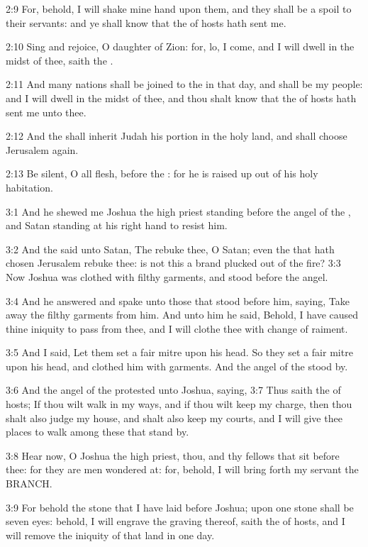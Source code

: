 2:9 For, behold, I will shake mine hand upon them, and they shall be a
spoil to their servants: and ye shall know that the \LORD of hosts hath
sent me.

2:10 Sing and rejoice, O daughter of Zion: for, lo, I come, and I will
dwell in the midst of thee, saith the \LORD.

2:11 And many nations shall be joined to the \LORD in that day, and
shall be my people: and I will dwell in the midst of thee, and thou
shalt know that the \LORD of hosts hath sent me unto thee.

2:12 And the \LORD shall inherit Judah his portion in the holy land,
and shall choose Jerusalem again.

2:13 Be silent, O all flesh, before the \LORD: for he is raised up out
of his holy habitation.

3:1 And he shewed me Joshua the high priest standing before the angel
of the \LORD, and Satan standing at his right hand to resist him.

3:2 And the \LORD said unto Satan, The \LORD rebuke thee, O Satan; even
the \LORD that hath chosen Jerusalem rebuke thee: is not this a brand
plucked out of the fire?  3:3 Now Joshua was clothed with filthy
garments, and stood before the angel.

3:4 And he answered and spake unto those that stood before him,
saying, Take away the filthy garments from him. And unto him he said,
Behold, I have caused thine iniquity to pass from thee, and I will
clothe thee with change of raiment.

3:5 And I said, Let them set a fair mitre upon his head. So they set a
fair mitre upon his head, and clothed him with garments. And the angel
of the \LORD stood by.

3:6 And the angel of the \LORD protested unto Joshua, saying, 3:7 Thus
saith the \LORD of hosts; If thou wilt walk in my ways, and if thou
wilt keep my charge, then thou shalt also judge my house, and shalt
also keep my courts, and I will give thee places to walk among these
that stand by.

3:8 Hear now, O Joshua the high priest, thou, and thy fellows that sit
before thee: for they are men wondered at: for, behold, I will bring
forth my servant the BRANCH.

3:9 For behold the stone that I have laid before Joshua; upon one
stone shall be seven eyes: behold, I will engrave the graving thereof,
saith the \LORD of hosts, and I will remove the iniquity of that land
in one day.

